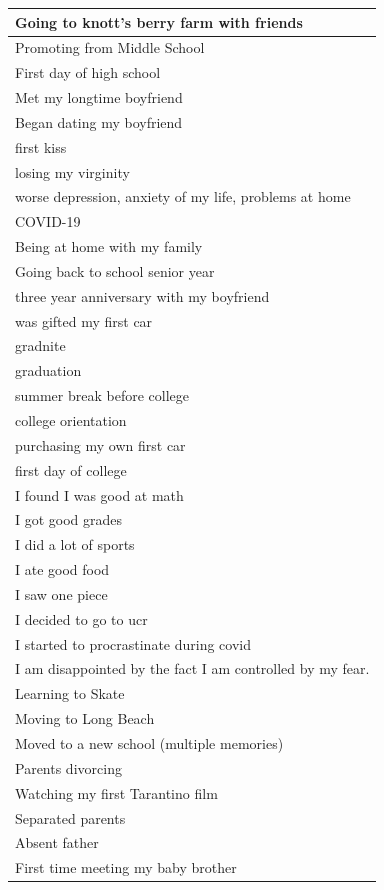 \documentclass[
  .7em,
  letterpaper,
  DIV=11,
  numbers=noendperiod]{scrartcl}
\begin{document}
\begin{table}
\begin{tabular}{l}
\hline
Going to knott's berry farm with friends\\
\hline
Promoting from Middle School\\
\hline
First day of high school\\
\hline
Met my longtime boyfriend\\
\hline
Began dating my boyfriend\\
\hline
first kiss\\
\hline
losing my virginity\\
\hline
worse depression, anxiety of my life, problems at home\\
\hline
COVID-19\\
\hline
Being at home with my family\\
\hline
Going back to school senior year\\
\hline
three year anniversary with my boyfriend\\
\hline
was gifted my first car\\
\hline
gradnite\\
\hline
graduation\\
\hline
summer break before college\\
\hline
college orientation\\
\hline
purchasing my own first car\\
\hline
first day of college\\
\hline
I found I was good at math\\
\hline
I got good grades\\
\hline
I did a lot of sports\\
\hline
I ate good food\\
\hline
I saw one piece\\
\hline
I decided to go to ucr\\
\hline
I started to procrastinate during covid\\
\hline
I am disappointed by the fact I am controlled by my fear.\\
\hline
Learning to Skate\\
\hline
Moving to Long Beach\\
\hline
Moved to a new school (multiple memories)\\
\hline
Parents divorcing\\
\hline
Watching my first Tarantino film\\
\hline
Separated parents\\
\hline
Absent father\\
\hline
First time meeting my baby brother\\

\end{tabular}
\end{table}
\end{document}
